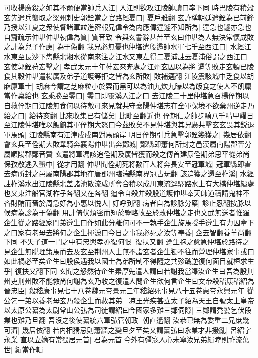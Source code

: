 可收楊廣殺之如其不爾便當帥兵入江|{
	入江則欲攻江陵帥讀曰率下同}
時巴陵有積穀玄先遣兵襲取之梁州刺史郭銓當之官路經夏口|{
	夏戶雅翻}
玄詐稱朝廷遣銓為已前鋒乃授以江夏之衆使督諸軍竝進密報兄偉令為内應偉遑遽不知所為|{
	遑急也遽亦急也}
自齎疏示仲堪仲堪執偉為質|{
	質音致}
令與玄書辭甚苦至玄曰仲堪為人無決常懷成敗之計為兒子作慮|{
	為于偽翻}
我兄必無憂也仲堪遣殷遹帥水軍七千至西江口|{
	水經江水東至長沙下雋縣北湘水從南來注之江水又東左得二夏浦註云夏浦俗謂之西江口}
玄使郭銓苻宏擊之|{
	孝武太元十年苻宏來奔處之江州玄因以為將}
遹等敗走玄頓已陵食其穀仲堪遣楊廣及弟子道護等拒之皆為玄所敗|{
	敗補邁翻}
江陵震駭城中乏食以胡麻廪軍士|{
	胡麻今謂之芝麻粒小於粟而黑可以為油九炊九曝以為飯食之使人不飢廩當作稟給也}
玄乘勝至零口|{
	零口即靈溪入江之口}
去江陵二十里仲堪急召楊佺期以自救佺期曰江陵無食何以待敵可來見就共守襄陽仲堪志在全軍保境不欲棄州逆走乃紿之曰|{
	紿待亥翻}
比來收集已有儲矣|{
	比毗至翻近也}
佺期信之帥步騎八千精甲耀日至江陵仲堪唯以飯餉其軍佺期大怒曰今茲敗矣不見仲堪與其兄廣共擊玄玄畏其鋭退軍馬頭|{
	江陵縣南有江津戍戍南對馬頭岸}
明日佺期引兵急擊郭銓幾獲之|{
	幾居依翻}
會玄兵至佺期大敗單騎奔襄陽仲堪出奔鄼城|{
	鄼縣即蕭何所封之邑漢屬南陽郡晉分屬順陽郡鄼音贊}
玄遣將軍馮該追佺期及廣皆獲而殺之傳首建康佺期弟思平從弟尚保孜敬逃入蠻中|{
	從才用翻}
仲堪聞佺期死將數百人將奔長安至冠軍城|{
	冠軍縣即霍去病所封之邑屬南陽郡其地在唐鄧州臨湍縣南界冠古玩翻}
該追獲之還至柞溪|{
	水經註柞溪水出江陵縣北盖諸池散流咸所會合積以成川東流逕驛路水上有大橋仲堪縊處也又東注船官湖柞子各翻又在各翻}
逼令自殺并殺殷道護仲堪奉天師道禱請鬼神不吝財賄而嗇於周急好為小惠以悦人|{
	好呼到翻}
病者自為診脉分藥|{
	診止忍翻按脉以候病為診為于偽翻}
用計倚伏煩密而短於鑒略故至於敗仲堪之走也文武無送者惟羅企生從之路經家門弟遵生曰作如此分離何可不一執手企生旋馬授手遵生有力因牽下之曰家有老母去將何之企生揮淚曰今日之事我必死之汝等奉養|{
	企去智翻養羊尚翻下同}
不失子道一門之中有忠與孝亦復何恨|{
	復扶又翻}
遵生抱之愈急仲堪於路待之見企生無脱理策馬而去及玄至荆州人士無不詣玄者企生獨不往而營理仲堪家事或曰如此禍必至矣企生曰殷侯遇我以國士為弟所制不得隨之共殄醜逆復何面目就桓求生乎|{
	復扶又翻下同}
玄聞之怒然待企生素厚先遣人謂曰若謝我當釋汝企生曰吾為殷荆州吏荆州敗不能救尚何謝為玄乃收之復遣人問企生欲何言企生曰文帝殺嵇康嵇紹為晉忠臣|{
	殺嵇康事見七十八卷魏元帝景元三年嵇紹死事見八十五卷惠帝永興元年}
從公乞一弟以養老母玄乃殺企生而赦其弟　凉王光疾甚立太子紹為天王自號太上皇帝以太原公纂為太尉常山公弘為司徒謂紹曰今國家多難三鄰伺隙|{
	三鄰謂秃髪乞伏段業也難乃旦翻}
吾沒之後使纂統六軍弘管朝政|{
	朝直遙翻}
汝恭已無為委重二兄庶幾可濟|{
	幾居依翻}
若内相猜忌則蕭牆之變旦夕至矣又謂纂弘曰永業才非撥亂|{
	呂紹字永業}
直以立嫡有常猥居元首|{
	君為元首}
今外有彊寇人心未寧汝兄弟緝睦則祚流萬世|{
	緝當作輯}

